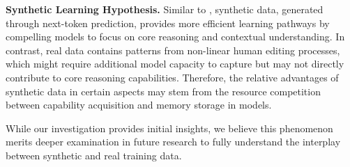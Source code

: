 \textbf{Synthetic Learning Hypothesis.}
Similar to \citet{abdin2024phi}, synthetic data, generated through next-token prediction,
provides more efficient learning pathways by compelling models to focus on core reasoning and contextual understanding.
In contrast, real data contains patterns from non-linear human editing processes, which might require additional model capacity to capture but may not directly contribute to core reasoning capabilities.
Therefore, the relative advantages of synthetic data in certain aspects may stem from the resource competition between capability acquisition and memory storage in models.

While our investigation provides initial insights, we believe this phenomenon merits deeper examination in future research to fully understand the interplay between synthetic and real training data.


